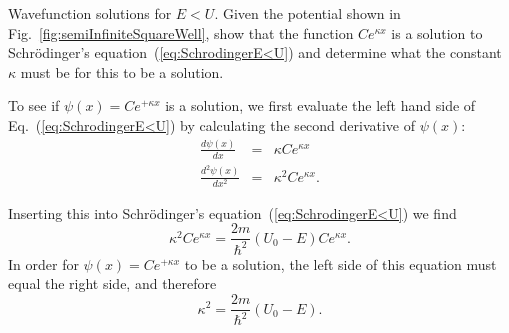 \begin{example}{Wavefunction solutions for $E < U$.}
\label{ex:SolutionElessU}
  Given the potential shown in Fig.~\ref{fig:semiInfiniteSquareWell},
  show that the function $C e^{\kappa x}$ is a solution to
  Schr\"odinger's equation~(\ref{eq:SchrodingerE<U}) and determine
  what the constant $\kappa$ must be for this to be a solution.

\begin{solution}
To see if $\psi(x) = C e^{+\kappa x}$ is a
solution, we first evaluate the left hand side of Eq.~(\ref{eq:SchrodingerE<U})
 by calculating the second derivative of $\psi(x)$:
\begin{eqnarray}
\frac{d \psi(x)}{dx} & = & \kappa  C e^{\kappa x} \nonumber \\
\frac{d^2 \psi(x)}{dx^2} & = & \kappa^2 C e^{\kappa x}. 
\end{eqnarray}

\noindent Inserting this into Schr\"odinger's equation~(\ref{eq:SchrodingerE<U})
we find \begin{equation}
\kappa^2 C e^{\kappa x} 
   = \frac{2m}{\hbar^2}\left( U_0 - E \right) C e^{\kappa x} .
\end{equation}
In order for $\psi(x) = C e^{+\kappa x}$ to be a solution,
the left side of this equation must equal the right side, and
therefore
\begin{equation}
\kappa^2 = \frac{2m}{\hbar^2}\left( U_0 - E \right) .
\end{equation}
\end{solution}
\end{example}
\newpage

